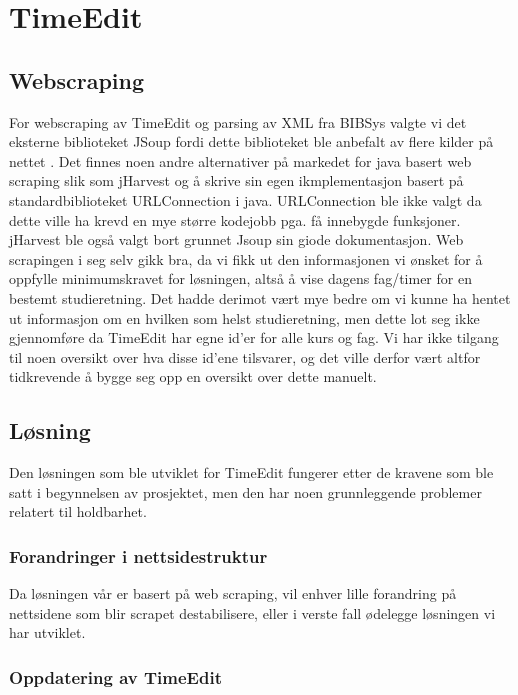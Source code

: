\documentclass[../main.tex]{subfiles}
\begin{document}
\section{TimeEdit}

\subsection{Webscraping}

For webscraping av TimeEdit og parsing av XML fra BIBSys valgte vi det eksterne biblioteket JSoup fordi dette biblioteket ble anbefalt av flere kilder på nettet . Det finnes noen andre alternativer på markedet for java basert web scraping slik som jHarvest og å skrive sin egen ikmplementasjon basert på standardbiblioteket URLConnection i java. URLConnection ble ikke valgt da dette ville ha krevd en mye større kodejobb pga. få innebygde funksjoner. jHarvest ble også valgt bort grunnet Jsoup sin giode dokumentasjon. \newline
Web scrapingen i seg selv gikk bra, da vi fikk ut den informasjonen vi ønsket for å oppfylle minimumskravet for løsningen, altså å vise dagens fag/timer for en bestemt studieretning. Det hadde derimot vært mye bedre om vi kunne ha hentet ut informasjon om en hvilken som helst studieretning, men dette lot seg ikke gjennomføre da TimeEdit har egne id’er for alle kurs og fag. Vi har ikke tilgang til noen oversikt over hva disse id’ene tilsvarer, og det ville derfor vært altfor tidkrevende å bygge seg opp en oversikt over dette manuelt.

\subsection{Løsning}

Den løsningen som ble utviklet for TimeEdit fungerer etter de kravene som ble satt i begynnelsen av prosjektet, men den har noen grunnleggende problemer relatert til holdbarhet.

\subsubsection{Forandringer i nettsidestruktur}

Da løsningen vår er basert på web scraping, vil enhver lille forandring på nettsidene som blir scrapet destabilisere, eller i verste fall ødelegge løsningen vi har utviklet. 

\subsubsection{Oppdatering av TimeEdit}
\end{document}
